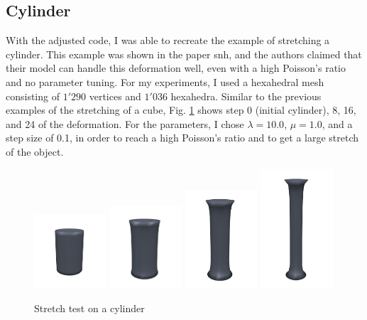 \subsection{Cylinder}
With the adjusted code, I was able to recreate the example of stretching a cylinder. This example was shown in the paper \acrshort{snh}, and the authors claimed that their model can handle this deformation well, even with a high Poisson's ratio and no parameter tuning. For my experiments, I used a hexahedral mesh consisting of $1'290$ vertices and $1'036$ hexahedra. Similar to the previous examples of the stretching of a cube, Fig. \ref{fig:stretchtest_cylinder} shows step 0 (initial cylinder), 8, 16, and 24 of the deformation. For the parameters, I chose $\lambda = 10.0$, $\mu = 1.0$, and a step size of 0.1, in order to reach a high Poisson's ratio and to get a large stretch of the object.
\begin{figure}[!htbp]
    \centering
    \includegraphics[width=0.24\textwidth]{resources/cylinder_00_new.png}
    \hfill
    \includegraphics[width=0.24\textwidth]{resources/cylinder_08_new.png}
    \hfill
    \includegraphics[width=0.24\textwidth]{resources/cylinder_16_new.png}
    \hfill
    \includegraphics[width=0.24\textwidth]{resources/cylinder_24_new.png}
    \hfill
    \caption{Stretch test on a cylinder}
    \label{fig:stretchtest_cylinder}
\end{figure}

